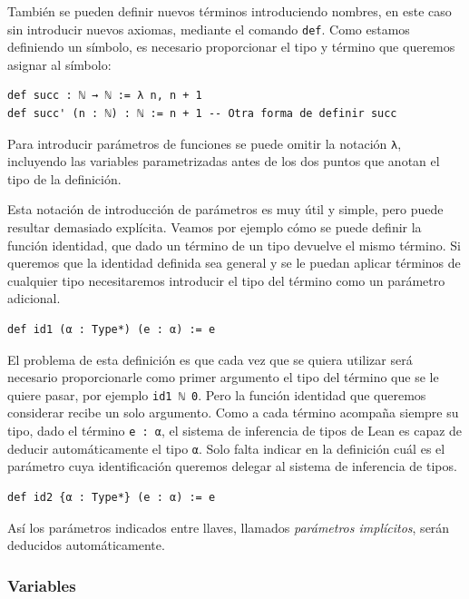 También se pueden definir nuevos términos introduciendo nombres, en este caso
sin introducir nuevos axiomas, mediante el comando \lstinline{def}. Como estamos
definiendo un símbolo, es necesario proporcionar el tipo y término que queremos
asignar al símbolo:

\begin{lstlisting}
def succ : ℕ → ℕ := λ n, n + 1
def succ' (n : ℕ) : ℕ := n + 1 -- Otra forma de definir succ
\end{lstlisting}

Para introducir parámetros de funciones se puede omitir la notación
\lstinline{λ}, incluyendo las variables parametrizadas antes de los dos puntos
que anotan el tipo de la definición.

Esta notación de introducción de parámetros es muy útil y simple, pero puede
resultar demasiado explícita. Veamos por ejemplo cómo se puede definir la
función identidad, que dado un término de un tipo devuelve el mismo término.
Si queremos que la identidad definida sea general y se le puedan aplicar términos
de cualquier tipo necesitaremos introducir el tipo del término como un parámetro
adicional.

\begin{lstlisting}
def id1 (α : Type*) (e : α) := e
\end{lstlisting}

El problema de esta definición es que cada vez que se quiera utilizar será
necesario proporcionarle como primer argumento el tipo del término que se le
quiere pasar, por ejemplo \lstinline{id1 ℕ 0}.
Pero la función identidad que queremos considerar recibe un solo argumento.
Como a cada término acompaña siempre su tipo, dado el término \lstinline{e : α},
el sistema de inferencia de tipos de Lean es capaz de deducir automáticamente el
tipo \lstinline{α}. Solo falta indicar en la definición cuál es el parámetro
cuya identificación queremos delegar al sistema de inferencia de tipos.\\

\begin{lstlisting}
def id2 {α : Type*} (e : α) := e
\end{lstlisting}

Así los parámetros indicados entre llaves, llamados \textit{parámetros
	implícitos}, serán deducidos automáticamente.

\subsubsection*{Variables}%

